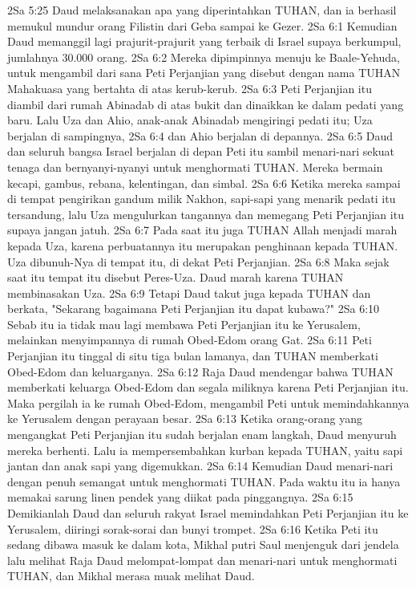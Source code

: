 2Sa 5:25  Daud melaksanakan apa yang diperintahkan TUHAN, dan ia berhasil memukul mundur orang Filistin dari Geba sampai ke Gezer.
2Sa 6:1  Kemudian Daud memanggil lagi prajurit-prajurit yang terbaik di Israel supaya berkumpul, jumlahnya 30.000 orang.
2Sa 6:2  Mereka dipimpinnya menuju ke Baale-Yehuda, untuk mengambil dari sana Peti Perjanjian yang disebut dengan nama TUHAN Mahakuasa yang bertahta di atas kerub-kerub.
2Sa 6:3  Peti Perjanjian itu diambil dari rumah Abinadab di atas bukit dan dinaikkan ke dalam pedati yang baru. Lalu Uza dan Ahio, anak-anak Abinadab mengiringi pedati itu; Uza berjalan di sampingnya,
2Sa 6:4  dan Ahio berjalan di depannya.
2Sa 6:5  Daud dan seluruh bangsa Israel berjalan di depan Peti itu sambil menari-nari sekuat tenaga dan bernyanyi-nyanyi untuk menghormati TUHAN. Mereka bermain kecapi, gambus, rebana, kelentingan, dan simbal.
2Sa 6:6  Ketika mereka sampai di tempat pengirikan gandum milik Nakhon, sapi-sapi yang menarik pedati itu tersandung, lalu Uza mengulurkan tangannya dan memegang Peti Perjanjian itu supaya jangan jatuh.
2Sa 6:7  Pada saat itu juga TUHAN Allah menjadi marah kepada Uza, karena perbuatannya itu merupakan penghinaan kepada TUHAN. Uza dibunuh-Nya di tempat itu, di dekat Peti Perjanjian.
2Sa 6:8  Maka sejak saat itu tempat itu disebut Peres-Uza. Daud marah karena TUHAN membinasakan Uza.
2Sa 6:9  Tetapi Daud takut juga kepada TUHAN dan berkata, "Sekarang bagaimana Peti Perjanjian itu dapat kubawa?"
2Sa 6:10  Sebab itu ia tidak mau lagi membawa Peti Perjanjian itu ke Yerusalem, melainkan menyimpannya di rumah Obed-Edom orang Gat.
2Sa 6:11  Peti Perjanjian itu tinggal di situ tiga bulan lamanya, dan TUHAN memberkati Obed-Edom dan keluarganya.
2Sa 6:12  Raja Daud mendengar bahwa TUHAN memberkati keluarga Obed-Edom dan segala miliknya karena Peti Perjanjian itu. Maka pergilah ia ke rumah Obed-Edom, mengambil Peti untuk memindahkannya ke Yerusalem dengan perayaan besar.
2Sa 6:13  Ketika orang-orang yang mengangkat Peti Perjanjian itu sudah berjalan enam langkah, Daud menyuruh mereka berhenti. Lalu ia mempersembahkan kurban kepada TUHAN, yaitu sapi jantan dan anak sapi yang digemukkan.
2Sa 6:14  Kemudian Daud menari-nari dengan penuh semangat untuk menghormati TUHAN. Pada waktu itu ia hanya memakai sarung linen pendek yang diikat pada pinggangnya.
2Sa 6:15  Demikianlah Daud dan seluruh rakyat Israel memindahkan Peti Perjanjian itu ke Yerusalem, diiringi sorak-sorai dan bunyi trompet.
2Sa 6:16  Ketika Peti itu sedang dibawa masuk ke dalam kota, Mikhal putri Saul menjenguk dari jendela lalu melihat Raja Daud melompat-lompat dan menari-nari untuk menghormati TUHAN, dan Mikhal merasa muak melihat Daud.

